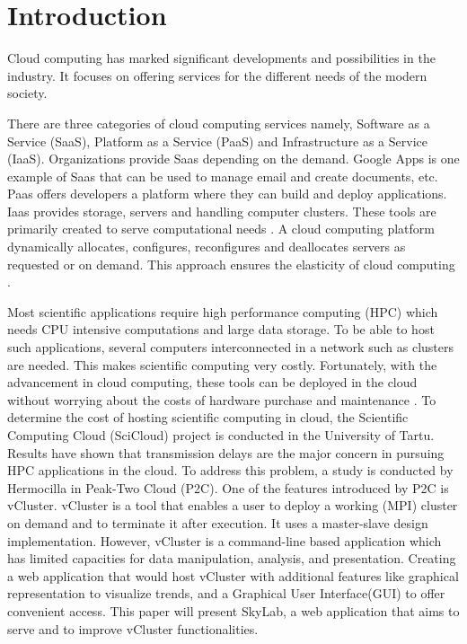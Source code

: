 \section{Introduction}

Cloud computing has marked significant developments and possibilities in the industry. It focuses on offering services for the different needs of the modern society.


There are three categories of cloud computing services namely, Software as a Service (SaaS), Platform as a Service (PaaS) and Infrastructure as a Service (IaaS). Organizations provide Saas depending on the demand. Google Apps is one example of Saas that can be used to manage email and create documents, etc. Paas offers developers a platform where they can build and deploy applications. Iaas provides storage, servers and handling computer clusters. These tools are primarily created to serve computational needs \cite {Ahuja2012}. A cloud computing platform dynamically allocates, configures, reconfigures and deallocates servers as requested or on demand. This approach ensures the elasticity of cloud computing \cite {Brandic2011}.


Most scientific applications require high performance computing (HPC) which needs CPU intensive computations and large data storage. To be able to host such applications, several computers interconnected in a network such as clusters are needed. This makes scientific computing very costly. Fortunately, with the advancement in cloud computing, these tools can be deployed in the cloud without worrying about the costs of hardware purchase and maintenance \cite {Ahuja2012}. To determine the cost of hosting scientific computing in cloud, the Scientific Computing Cloud (SciCloud) project is conducted in the University of Tartu. Results have shown that transmission delays are the major concern in pursuing HPC applications in the cloud\cite {Brandic2011}.  To address this problem, a study is conducted by Hermocilla\cite {Hermocilla2014} in Peak-Two Cloud (P2C). One of the features introduced by P2C is vCluster. vCluster is a tool that enables a user to deploy a working (MPI) cluster on demand and to terminate it after execution. It uses a master-slave design implementation. However, vCluster is a command-line based application which has limited capacities for data manipulation, analysis, and presentation. Creating a web application that would host vCluster with additional features like graphical representation to visualize trends, and a Graphical User Interface(GUI) to offer convenient access. This paper will present SkyLab, a web application that aims to serve and to improve vCluster functionalities.

